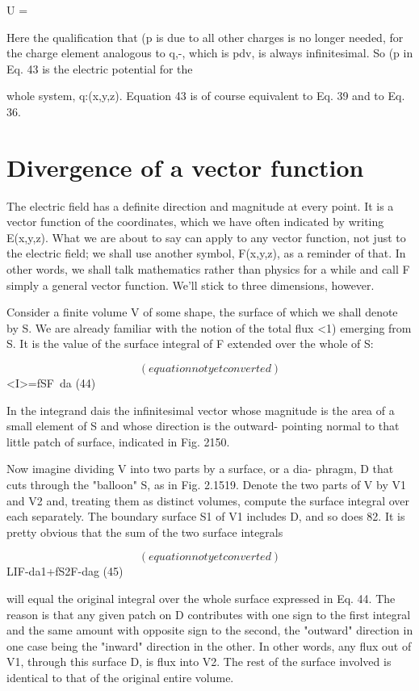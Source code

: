 U = %

Here the qualification that (p is due to all other charges is no longer
needed, for the charge element analogous to q,-, which is pdv, is
always infinitesimal. So (p in Eq. 43 is the electric potential for the

whole system, q:(x,y,z). Equation 43 is of course equivalent to
Eq. 39 and to Eq. 36.

\section{Divergence of a vector function}

The electric field has a definite direction and magnitude at every
point. It is a vector function of the coordinates, which we have often
indicated by writing E(x,y,z). What we are about to say can apply
to any vector function, not just to the electric field; we shall use
another symbol, F(x,y,z), as a reminder of that. In other words, we
shall talk mathematics rather than physics for a while and call F
simply a general vector function. We'll stick to three dimensions,
however.

Consider a finite volume V of some shape, the surface of which we
shall denote by S. We are already familiar with the notion of the total
flux <1) emerging from S. It is the value of the surface integral of F
extended over the whole of S:

\begin{equation}
(equation not yet converted)
\end{equation}
<I>=fSF~da (44)

In the integrand dais the infinitesimal vector whose magnitude is the
area of a small element of S and whose direction is the outward-
pointing normal to that little patch of surface, indicated in Fig. 2150.

Now imagine dividing V into two parts by a surface, or a dia-
phragm, D that cuts through the "balloon" S, as in Fig. 2.1519.
Denote the two parts of V by V1 and V2 and, treating them as distinct
volumes, compute the surface integral over each separately. The
boundary surface S1 of V1 includes D, and so does 82. It is pretty
obvious that the sum of the two surface integrals

\begin{equation}
(equation not yet converted)
\end{equation}
LIF-da1+fS2F-dag (45)

will equal the original integral over the whole surface expressed in
Eq. 44. The reason is that any given patch on D contributes with
one sign to the first integral and the same amount with opposite sign
to the second, the "outward" direction in one case being the "inward"
direction in the other. In other words, any flux out of V1, through
this surface D, is flux into V2. The rest of the surface involved is
identical to that of the original entire volume.

